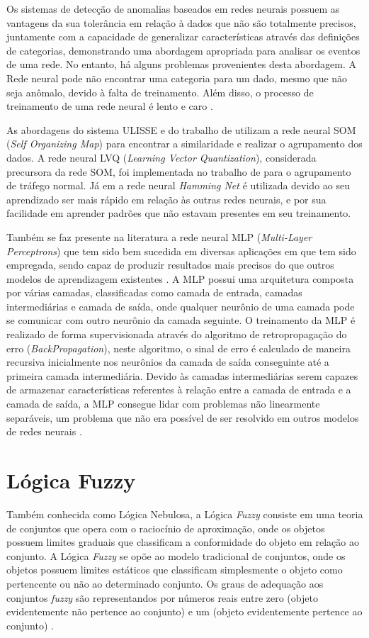 \indent Os sistemas de detecção de anomalias baseados em redes neurais possuem as vantagens da sua tolerância em relação à dados que não são totalmente precisos, juntamente com a capacidade de generalizar características através das definições de categorias, demonstrando uma abordagem apropriada para analisar os eventos de uma rede. No entanto, há alguns problemas provenientes desta abordagem. A Rede neural pode não encontrar uma categoria para um dado, mesmo que não seja anômalo, devido à falta de treinamento. Além disso, o processo de treinamento de uma rede neural é lento e caro \cite{patcha2007}.

\indent As abordagens do sistema ULISSE \cite{Zanero2008} e do trabalho de  utilizam a rede neural SOM (\textit{Self Organizing Map}) para encontrar a similaridade e realizar o agrupamento dos dados. A rede neural LVQ (\textit{Learning Vector Quantization}), considerada precursora da rede SOM, foi implementada no trabalho de  para o agrupamento de tráfego normal. Já em  a rede neural \textit{Hamming Net} é utilizada devido ao seu aprendizado ser mais rápido em relação às outras redes neurais, e por sua facilidade em aprender padrões que não estavam presentes em seu treinamento.

Também se faz presente na literatura a rede neural MLP (\textit{Multi-Layer Perceptrons}) que tem sido bem sucedida em diversas aplicações em que tem sido empregada, sendo capaz de produzir resultados mais precisos do que outros modelos de aprendizagem existentes \cite{agrawal2015}. A MLP possui uma arquitetura composta por várias camadas, classificadas como camada de entrada, camadas intermediárias e camada de saída, onde qualquer neurônio de uma camada pode se comunicar com outro neurônio da camada seguinte. O treinamento da MLP é realizado de forma supervisionada através do algoritmo  de retropropagação do erro (\textit{BackPropagation}), neste algoritmo, o sinal de erro é calculado de maneira recursiva inicialmente nos neurônios da camada de saída conseguinte até a primeira camada intermediária. Devido às camadas intermediárias serem capazes de armazenar características referentes à relação entre a camada de entrada e a camada de saída, a MLP consegue lidar com problemas não linearmente separáveis, um problema que não era possível de ser resolvido em outros modelos de redes neurais \cite{soares2011}.

  \section{Lógica Fuzzy}
\indent Também conhecida como Lógica Nebulosa, a Lógica \textit{Fuzzy} consiste em uma teoria de conjuntos que opera com o raciocínio de aproximação, onde os objetos possuem limites graduais que classificam a conformidade do objeto em relação ao conjunto. A Lógica \textit{Fuzzy} se opõe ao modelo tradicional de conjuntos, onde os objetos possuem limites estáticos que classificam simplesmente o objeto como pertencente ou não ao determinado conjunto. Os graus de adequação aos conjuntos \textit{fuzzy} são representandos por números reais entre zero (objeto evidentemente não pertence ao conjunto) e um (objeto evidentemente pertence ao conjunto) \cite{rehman2009}.

